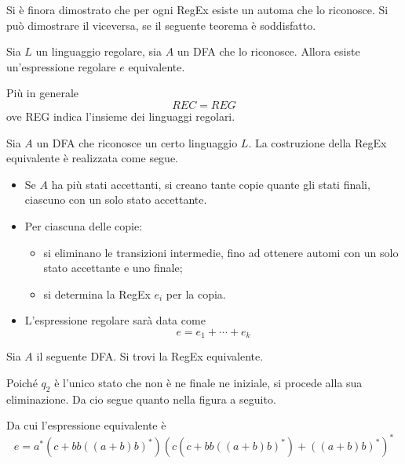 \documentclass{subfiles}
\begin{document}
Si è finora dimostrato che per ogni RegEx esiste un automa che lo riconosce. Si può dimostrare il viceversa, se il seguente teorema è soddisfatto.
\begin{Theorem*}[di Kleene]
    Sia \(L\) un linguaggio regolare, sia \(A\) un DFA che lo riconosce. Allora esiste un'espressione regolare \(e\) equivalente.

    Più in generale
    \[
        REC = REG
    \]
    ove REG indica l'insieme dei linguaggi regolari.
\end{Theorem*}


\begin{Algorithm*}
    Sia \(A\) un DFA che riconosce un certo linguaggio \(L\). La costruzione della RegEx equivalente è realizzata come segue.
    \begin{itemize}
        \item Se \(A\) ha più stati accettanti, si creano tante copie quante gli stati finali, ciascuno con un solo stato accettante.
        \item Per ciascuna delle copie:
              \begin{itemize}
                  \item si eliminano le transizioni intermedie, fino ad ottenere automi con un solo stato accettante e uno finale;
                  \item si determina la RegEx \(e_{i}\) per la copia.
              \end{itemize}
        \item L'espressione regolare sarà data come
              \[
                  e = e_{1} + \cdots + e_{k}
              \]
    \end{itemize}
\end{Algorithm*}

\begin{Example*}
    Sia \(A\) il seguente DFA. Si trovi la RegEx equivalente.
    

    \begin{Solution*}
        Poiché \(q_{2}\) è l'unico stato che non è ne finale ne iniziale, si procede alla sua eliminazione.
        Da cio segue quanto nella figura a seguito.
        

        \noindent Da cui l'espressione equivalente è
        \[
            e = a^{*}(c + bb((a + b)b)^{*})(c(c + bb((a + b)b)^{*}) + ((a + b)b)^{*})^{*}
        \]
    \end{Solution*}
\end{Example*}
\clearpage
\end{document}
